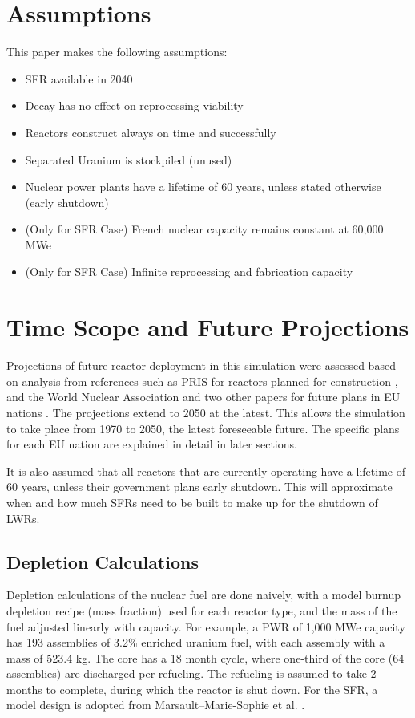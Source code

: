 \section{Assumptions}
This paper makes the following assumptions:
\begin{itemize}
	\item SFR available in 2040
	\item Decay has no effect on reprocessing viability
	\item Reactors construct always on time and successfully
	\item Separated Uranium is stockpiled (unused)
	\item Nuclear power plants have a lifetime of 60 years, unless stated otherwise (early shutdown)
	\item (Only for SFR Case) French nuclear capacity remains constant at 60,000 MWe
	\item (Only for SFR Case) Infinite reprocessing and fabrication capacity
\end{itemize}


\section{Time Scope and Future Projections}
Projections of future reactor deployment in this simulation were
assessed based on analysis from references such as \gls{PRIS} for reactors planned for construction \cite{iaea_pris_nodate},
and the World Nuclear Association and two other papers for future plans in EU nations
\cite{world_nuclear_association_nuclear_2017, joskow_future_2012, hatch_politics_2015}.
The projections extend to 2050 at the latest. This allows the simulation to take place from
1970 to 2050, the latest foreseeable future. The specific plans for each EU nation are explained
in detail in later sections.

It is also assumed that all reactors that are 
currently operating have a lifetime of 60 years, unless their government plans
early shutdown. This will approximate when and how much \glspl{SFR} need to be built
to make up for the shutdown of \glspl{LWR}.


\subsection{Depletion Calculations}
Depletion calculations of the nuclear fuel are done
naively, with a model burnup depletion recipe (mass fraction) used
for each reactor type, and the mass of the fuel 
adjusted linearly with capacity. For example, a PWR of
1,000 MWe capacity has 193 assemblies of 3.2\% enriched
uranium fuel, with each assembly with a mass of 523.4 kg.
The core has a 18 month cycle, where one-third of the 
core (64 assemblies) are discharged per refueling. The refueling
is assumed to take 2 months to complete, during which the reactor
is shut down. For the \gls{SFR}, a model design is adopted from
Marsault–Marie-Sophie et al. \cite{marsaultmarie-sophie_pre-conceptual_2012}.

